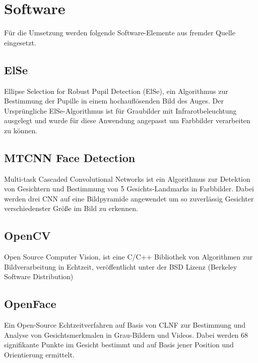 \section{Software}
Für die Umsetzung werden folgende Software-Elemente aus fremder Quelle eingesetzt.
\subsection{ElSe}
Ellipse Selection for Robust Pupil Detection (ElSe), ein Algorithmus zur Bestimmung der Pupille in einem hochauflösenden Bild des Auges. Der Ursprüngliche ElSe-Algorithmus ist für Graubilder mit Infrarotbeleuchtung ausgelegt und wurde für diese Anwendung angepasst um Farbbilder verarbeiten zu können.\\
\cite{ElSe}
\subsection{MTCNN Face Detection}
Multi-task Cascaded Convolutional Networks ist ein Algorithmus zur Detektion von Gesichtern und Bestimmung von 5 Gesichts-Landmarks in Farbbilder. Dabei werden drei CNN auf eine Bildpyramide angewendet um so zuverlässig Gesichter verschiedenster Größe im Bild zu erkennen.\\
\cite{MTCCN}
\subsection{OpenCV}
Open Source Computer Vision, ist eine C/C++ Bibliothek von Algorithmen zur Bildverarbeitung in Echtzeit, veröffentlicht unter der BSD Lizenz (Berkeley
Software Distribution)\\
\cite{wiki_Wha_is_OPenCV}\cite{OpenCv_What_Is}
\subsection{OpenFace}
Ein Open-Source Echtzeitverfahren auf Basis von CLNF zur Bestimmung und Analyse von Gesichtsmerkmalen in Grau-Bildern und Videos. Dabei werden 68 signifikante Punkte im Gesicht bestimmt und auf Basis jener Position und Orientierung ermittelt.\\
\cite{OpenFace}
